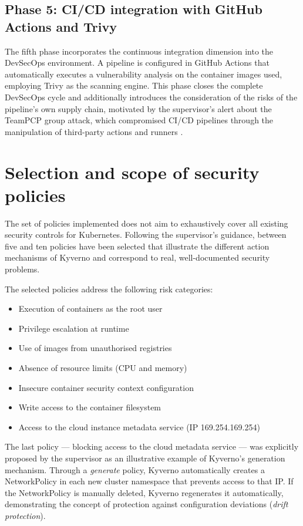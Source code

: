 \subsection{Phase 5: CI/CD integration with GitHub Actions and Trivy}

The fifth phase incorporates the continuous integration dimension into the DevSecOps environment. A pipeline is configured in GitHub Actions that automatically executes a vulnerability analysis on the container images used, employing Trivy as the scanning engine. This phase closes the complete DevSecOps cycle and additionally introduces the consideration of the risks of the pipeline's own supply chain, motivated by the supervisor's alert about the TeamPCP group attack, which compromised CI/CD pipelines through the manipulation of third-party actions and runners \cite{teampcp2026}.

\section{Selection and scope of security policies}

The set of policies implemented does not aim to exhaustively cover all existing security controls for Kubernetes. Following the supervisor's guidance, between five and ten policies have been selected that illustrate the different action mechanisms of Kyverno and correspond to real, well-documented security problems.

The selected policies address the following risk categories:

\begin{itemize}
    \item Execution of containers as the root user
    \item Privilege escalation at runtime
    \item Use of images from unauthorised registries
    \item Absence of resource limits (CPU and memory)
    \item Insecure container security context configuration
    \item Write access to the container filesystem
    \item Access to the cloud instance metadata service (IP 169.254.169.254)
\end{itemize}

The last policy --- blocking access to the cloud metadata service --- was explicitly proposed by the supervisor as an illustrative example of Kyverno's generation mechanism. Through a \textit{generate} policy, Kyverno automatically creates a NetworkPolicy in each new cluster namespace that prevents access to that IP. If the NetworkPolicy is manually deleted, Kyverno regenerates it automatically, demonstrating the concept of protection against configuration deviations (\textit{drift protection}).

